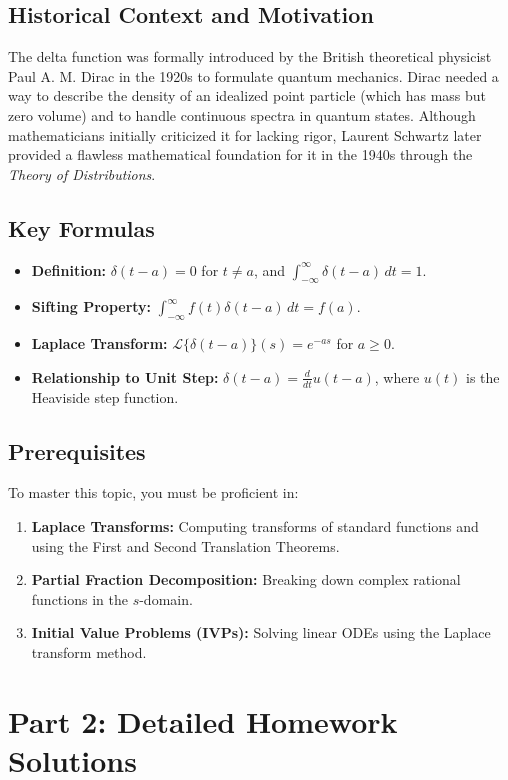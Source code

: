 \documentclass[11pt, letterpaper]{article}
\theoremstyle{definition}
\theoremstyle{remark}
\newcommand{\Laplace}{\mathcal{L}}
\begin{document}
\subsection{Historical Context and Motivation}
The delta function was formally introduced by the British theoretical physicist Paul A. M. Dirac in the 1920s to formulate quantum mechanics. Dirac needed a way to describe the density of an idealized point particle (which has mass but zero volume) and to handle continuous spectra in quantum states. Although mathematicians initially criticized it for lacking rigor, Laurent Schwartz later provided a flawless mathematical foundation for it in the 1940s through the \textit{Theory of Distributions}.

\subsection{Key Formulas}
\begin{itemize}
    \item \textbf{Definition:} $\delta(t-a) = 0$ for $t \neq a$, and $\int_{-\infty}^{\infty} \delta(t-a) \, dt = 1$.
    \item \textbf{Sifting Property:} $\int_{-\infty}^{\infty} f(t)\delta(t-a) \, dt = f(a)$.
    \item \textbf{Laplace Transform:} $\Laplace\{\delta(t-a)\}(s) = e^{-as}$ for $a \geq 0$.
    \item \textbf{Relationship to Unit Step:} $\delta(t-a) = \frac{d}{dt} u(t-a)$, where $u(t)$ is the Heaviside step function.
\end{itemize}

\subsection{Prerequisites}
To master this topic, you must be proficient in:
\begin{enumerate}
    \item \textbf{Laplace Transforms:} Computing transforms of standard functions and using the First and Second Translation Theorems.
    \item \textbf{Partial Fraction Decomposition:} Breaking down complex rational functions in the $s$-domain.
    \item \textbf{Initial Value Problems (IVPs):} Solving linear ODEs using the Laplace transform method.
\end{enumerate}

\newpage
\section{Part 2: Detailed Homework Solutions}
\end{document}
